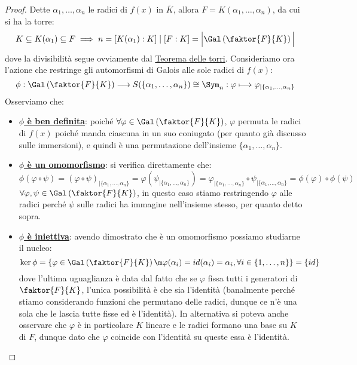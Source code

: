 \documentclass[11pt]{scrartcl}
\begin{document}
\begin{proof}
    Dette $\alpha_1,\ldots,\alpha_n$ le radici di $f(x)$ in $\overline K$, allora $F = K(\alpha_1,\ldots,\alpha_n)$, da cui si ha la torre:
    \[ K \subseteq K(\alpha_1) \subseteq F \implies n = [K(\alpha_1) : K] \mid [F : K] = \Big|\Gal\left(\faktor{F}{K}\right)\Big|
        \]
    dove la divisibilità segue ovviamente dal \hyperref[torri]{Teorema delle torri}. Consideriamo ora l'azione che restringe gli automorfismi di Galois alle sole radici di $f(x)$:
    \[ \phi: \Gal\left(\faktor{F}{K}\right) \longrightarrow S(\{\alpha_1,\ldots,\alpha_n\}) \cong \Sym_n : \varphi \longmapsto \varphi_{|\{\alpha_1,\ldots,\alpha_n\}}
        \]
    Osserviamo che:
    \begin{itemize}
        \item \underline{\textbf{$\phi$ è ben definita}}: poiché $\forall \varphi \in \Gal\left(\faktor{F}{K}\right)$, $\varphi$ permuta le radici di $f(x)$ poiché manda ciascuna in un suo coniugato (per quanto già discusso sulle immersioni), e quindi è una permutazione dell'insieme $\{\alpha_1,\ldots,\alpha_n\}$.
        \item \underline{\textbf{$\phi$ è un omomorfismo}}: si verifica direttamente che:
        \[ \phi(\varphi \circ \psi) = (\varphi \circ \psi)_{|{\{\alpha_1,\ldots,\alpha_n\}}} = \varphi(\psi_{|{\{\alpha_1,\ldots,\alpha_n\}}}) = \varphi_{|{\{\alpha_1,\ldots,\alpha_n\}}} \circ \psi_{|{\{\alpha_1,\ldots,\alpha_n\}}} = \phi(\varphi) \circ \phi(\psi)
            \]
        $\forall \varphi,\psi \in \Gal\left(\faktor{F}{K}\right)$, in questo caso stiamo restringendo $\varphi$ alle radici perché $\psi$ sulle radici ha immagine nell'insieme stesso, per quanto detto sopra.    
        \item \underline{\textbf{$\phi$ è iniettiva}}: avendo dimostrato che è un omomorfismo possiamo studiarne il nucleo:
        \[ \ker \phi = \left\{\varphi \in \Gal\left(\faktor{F}{K}\right) \m \varphi(\alpha_i) = id(\alpha_i) = \alpha_i, \forall i \in \{1,\ldots,n\}\right\} = \{id\}
            \]
        dove l'ultima uguaglianza è data dal fatto che se $\varphi$ fissa tutti i generatori di $\faktor{F}{K}$, l'unica possibilità è che sia l'identità (banalmente perché stiamo considerando funzioni che permutano delle radici,
        dunque ce n'è una sola che le lascia tutte fisse ed è l'identità). In alternativa si poteva anche osservare che $\varphi$ è in particolare $K$ lineare e le radici formano una base su $K$ di $F$, dunque dato che $\varphi$ coincide
        con l'identità su queste essa è l'identità.
    \end{itemize}
\end{proof}
\end{document}
